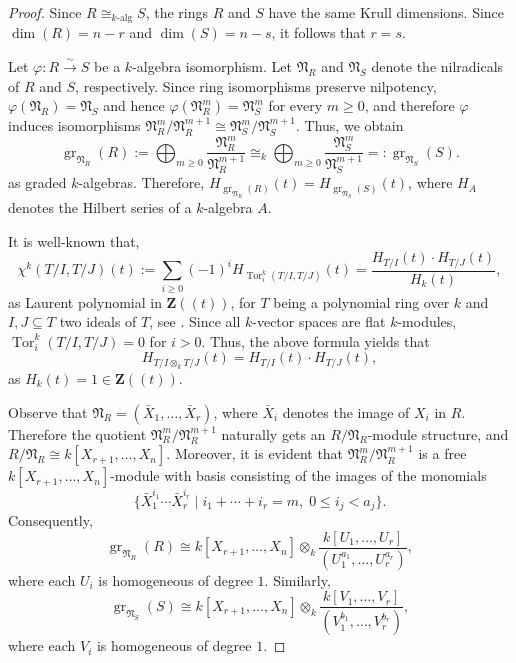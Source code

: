 \documentclass[english,10pt,reqno,twoside]{amsart}
\numberwithin{equation}{section}
\numberwithin{figure}{section}
\theoremstyle{plain}
\theoremstyle{plain}
\theoremstyle{definition}
\theoremstyle{plain}
\numberwithin{equation}{section}
\newcommand{\Z}{\mathbf{Z}}
\newcommand{\Tor}{\operatorname{Tor}}
\begin{document}
\begin{proof}
Since $R\cong_{k\text{-alg}} S$, the rings $R$ and $S$ have the same Krull dimensions. Since $\dim(R)=n-r$ and $\dim(S)=n-s$, it follows that $r=s$.

Let $\varphi:R\xrightarrow{\sim}S$ be a $k$-algebra isomorphism. Let $\mathfrak{N}_R$ and $\mathfrak{N}_S$ denote the nilradicals of $R$ and $S$, respectively. Since ring isomorphisms preserve nilpotency, $\varphi(\mathfrak N_R)=\mathfrak N_S$ and hence $\varphi(\mathfrak N_R^m)=\mathfrak N_S^m$
for every $m\ge0$, and therefore $\varphi$ induces isomorphisms $\mathfrak N_R^m/\mathfrak N_R^{m+1} \cong
\mathfrak N_S^m/\mathfrak N_S^{m+1}$. Thus, we obtain
\[
\operatorname{gr}_{\mathfrak{N}_R}(R)
:=
\bigoplus_{m\geq 0}
\frac{\mathfrak{N}_R^m}{\mathfrak{N}_R^{m+1}}
\cong_k
\bigoplus_{m\geq 0}
\frac{\mathfrak{N}_S^m}{\mathfrak{N}_S^{m+1}}
=: \operatorname{gr}_{\mathfrak{N}_S}(S).
\]
as graded $k$-algebras. Therefore, $H_{\operatorname{gr}_{\mathfrak{N}_R}(R)}(t)= H_{\operatorname{gr}_{\mathfrak{N}_S}(S)}(t)$,
where $H_{A}$ denotes the Hilbert series of a $k$-algebra $A$. 

It is well-known that, $$\chi^k(T/I, T/J)(t) :=\sum\limits_{i\geq 0}(-1)^i H_{\Tor^k_i(T/I,T/J)}(t)=\frac{H_{T/I}(t)\cdot H_{T/J}(t)}{H_{k}(t)},$$ as Laurent polynomial in $\Z(\!(t)\!)$, for $T$ being a polynomial ring over $k$ and $I, J \subseteq T$ two ideals of $T$, see \cite{AB1993}. Since all $k$-vector spaces are flat $k$-modules, $\Tor^k_i(T/I,T/J)=0$ for $i>0$. Thus, the above formula yields that 
\begin{equation}\label{eq:mult_of_Hilbert_series}
    H_{T/I\otimes_k T/J}(t)=H_{T/I}(t)\cdot H_{T/J}(t),
\end{equation} 
as $H_{k}(t)=1 \in \Z(\!(t)\!)$.

Observe that $\mathfrak{N}_R=(\bar{X}_1,\ldots,\bar{X}_r)$, where $\bar{X}_i$ denotes the image of $X_i$ in $R$. Therefore the quotient $\mathfrak N_R^m/\mathfrak N_R^{m+1}$ naturally gets an $R/\mathfrak{N}_R$-module structure, and $R/\mathfrak{N}_R \cong k[X_{r+1},\ldots,X_n]$. Moreover, it is evident that $\mathfrak N_R^m/\mathfrak N_R^{m+1}$ is a free $k[X_{r+1},\ldots,X_n]$-module with basis consisting of the images of the monomials
\[
\{\bar{X}_1^{i_1}\cdots \bar{X}_r^{i_r}
\mid
i_1+\cdots+i_r=m,\;
0\le i_j<a_j
\}.
\]
Consequently,
\[
\operatorname{gr}_{\mathfrak N_R}(R)
\cong
k[X_{r+1},\ldots,X_n]
\otimes_k
\frac{k[U_1,\ldots,U_r]}
{(U_1^{a_1},\ldots,U_r^{a_r})},
\]
where each $U_i$ is homogeneous of degree $1$. Similarly,
\[
\operatorname{gr}_{\mathfrak{N}_S}(S)
\cong
k[X_{r+1},\ldots,X_n]
\otimes_k
\frac{k[V_1,\ldots,V_r]}
{(V_1^{b_1},\ldots,V_r^{b_r})},
\]
where each $V_i$ is homogeneous of degree $1$.


\end{proof}
\end{document}
